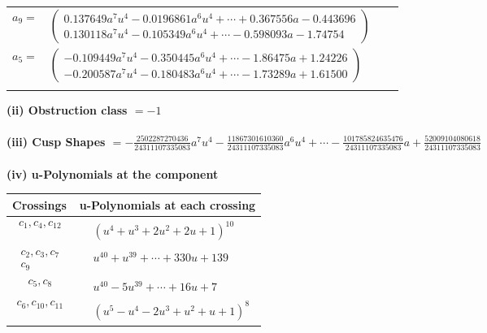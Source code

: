 \documentclass[1p]{elsarticle_modified}
\theoremstyle{definition}
\begin{document}
\begin{tabular}{m{7pt} m{180pt} m{7pt} m{180pt} }
\flushright $a_{9}=$&$\begin{pmatrix}0.137649 a^{7} u^{4}-0.0196861 a^{6} u^{4}+\cdots+0.367556 a-0.443696\\0.130118 a^{7} u^{4}-0.105349 a^{6} u^{4}+\cdots-0.598093 a-1.74754\end{pmatrix}$ \\
\flushright $a_{5}=$&$\begin{pmatrix}-0.109449 a^{7} u^{4}-0.350445 a^{6} u^{4}+\cdots-1.86475 a+1.24226\\-0.200587 a^{7} u^{4}-0.180483 a^{6} u^{4}+\cdots-1.73289 a+1.61500\end{pmatrix}$\\&\end{tabular}
\flushleft \textbf{(ii) Obstruction class $= -1$}\\~\\
\flushleft \textbf{(iii) Cusp Shapes $= -\frac{2502287270436}{24311107335083} a^7 u^4-\frac{11867301610360}{24311107335083} a^6 u^4+\cdots-\frac{101785824635476}{24311107335083} a+\frac{52009104080618}{24311107335083}$}\\~\\
\newpage\renewcommand{\arraystretch}{1}
\flushleft \textbf{(iv) u-Polynomials at the component}\newline \\
\begin{tabular}{m{50pt}|m{274pt}}
Crossings & \hspace{64pt}u-Polynomials at each crossing \\
\hline $$\begin{aligned}c_{1},c_{4},c_{12}\end{aligned}$$&$\begin{aligned}
&(u^4+u^3+2 u^2+2 u+1)^{10}
\end{aligned}$\\
\hline $$\begin{aligned}c_{2},c_{3},c_{7}\\c_{9}\end{aligned}$$&$\begin{aligned}
&u^{40}+u^{39}+\cdots+330 u+139
\end{aligned}$\\
\hline $$\begin{aligned}c_{5},c_{8}\end{aligned}$$&$\begin{aligned}
&u^{40}-5 u^{39}+\cdots+16 u+7
\end{aligned}$\\
\hline $$\begin{aligned}c_{6},c_{10},c_{11}\end{aligned}$$&$\begin{aligned}
&(u^5- u^4-2 u^3+u^2+u+1)^8
\end{aligned}$\\
\hline
\end{tabular}\\~\\
\end{document}
